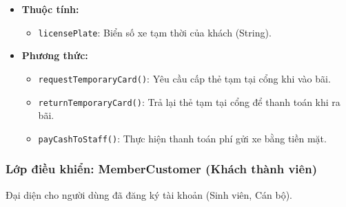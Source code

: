 \begin{itemize}
    \item \textbf{Thuộc tính:}
    \begin{itemize}
        \item \texttt{licensePlate}: Biển số xe tạm thời của khách (String).
    \end{itemize}
    \item \textbf{Phương thức:}
    \begin{itemize}
        \item \texttt{requestTemporaryCard()}: Yêu cầu cấp thẻ tạm tại cổng khi vào bãi.
        \item \texttt{returnTemporaryCard()}: Trả lại thẻ tạm tại cổng để thanh toán khi ra bãi.
        \item \texttt{payCashToStaff()}: Thực hiện thanh toán phí gửi xe bằng tiền mặt.
    \end{itemize}
\end{itemize}

\subsubsection{Lớp điều khiển: MemberCustomer (Khách thành viên)}
Đại diện cho người dùng đã đăng ký tài khoản (Sinh viên, Cán bộ).

